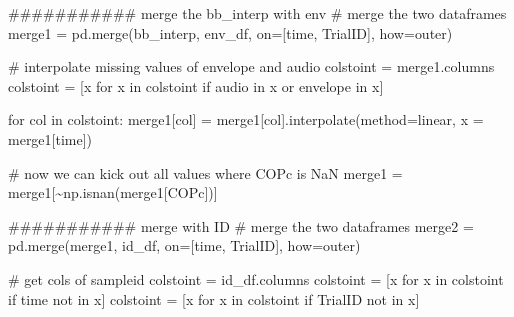 \documentclass[
  letterpaper,
  DIV=11,
  numbers=noendperiod]{scrreprt}
\newenvironment{Shaded}{\begin{snugshade}}{\end{snugshade}}
\newcommand{\CommentTok}[1]{\textcolor[rgb]{0.37,0.37,0.37}{#1}}
\newcommand{\ControlFlowTok}[1]{\textcolor[rgb]{0.00,0.23,0.31}{#1}}
\newcommand{\KeywordTok}[1]{\textcolor[rgb]{0.00,0.23,0.31}{#1}}
\newcommand{\NormalTok}[1]{\textcolor[rgb]{0.00,0.23,0.31}{#1}}
\newcommand{\OperatorTok}[1]{\textcolor[rgb]{0.37,0.37,0.37}{#1}}
\newcommand{\StringTok}[1]{\textcolor[rgb]{0.13,0.47,0.30}{#1}}
\begin{document}
\begin{Shaded}
\begin{Highlighting}[]
    \CommentTok{\#\#\#\#\#\#\#\#\#\#\# merge the bb\_interp with env}
    \CommentTok{\# merge the two dataframes}
\NormalTok{    merge1 }\OperatorTok{=}\NormalTok{ pd.merge(bb\_interp, env\_df, on}\OperatorTok{=}\NormalTok{[}\StringTok{\textquotesingle{}time\textquotesingle{}}\NormalTok{, }\StringTok{\textquotesingle{}TrialID\textquotesingle{}}\NormalTok{], how}\OperatorTok{=}\StringTok{\textquotesingle{}outer\textquotesingle{}}\NormalTok{)}

    \CommentTok{\# interpolate missing values of envelope and audio}
\NormalTok{    colstoint }\OperatorTok{=}\NormalTok{ merge1.columns}
\NormalTok{    colstoint }\OperatorTok{=}\NormalTok{ [x }\ControlFlowTok{for}\NormalTok{ x }\KeywordTok{in}\NormalTok{ colstoint }\ControlFlowTok{if} \StringTok{\textquotesingle{}audio\textquotesingle{}} \KeywordTok{in}\NormalTok{ x }\KeywordTok{or} \StringTok{\textquotesingle{}envelope\textquotesingle{}} \KeywordTok{in}\NormalTok{ x]}

    \ControlFlowTok{for}\NormalTok{ col }\KeywordTok{in}\NormalTok{ colstoint: }
\NormalTok{        merge1[col] }\OperatorTok{=}\NormalTok{ merge1[col].interpolate(method}\OperatorTok{=}\StringTok{\textquotesingle{}linear\textquotesingle{}}\NormalTok{, x }\OperatorTok{=}\NormalTok{ merge1[}\StringTok{\textquotesingle{}time\textquotesingle{}}\NormalTok{])}

    \CommentTok{\# now we can kick out all values where COPc is NaN}
\NormalTok{    merge1 }\OperatorTok{=}\NormalTok{ merge1[}\OperatorTok{\textasciitilde{}}\NormalTok{np.isnan(merge1[}\StringTok{\textquotesingle{}COPc\textquotesingle{}}\NormalTok{])]}

    \CommentTok{\#\#\#\#\#\#\#\#\#\#\# merge with ID}
    \CommentTok{\# merge the two dataframes}
\NormalTok{    merge2 }\OperatorTok{=}\NormalTok{ pd.merge(merge1, id\_df, on}\OperatorTok{=}\NormalTok{[}\StringTok{\textquotesingle{}time\textquotesingle{}}\NormalTok{, }\StringTok{\textquotesingle{}TrialID\textquotesingle{}}\NormalTok{], how}\OperatorTok{=}\StringTok{\textquotesingle{}outer\textquotesingle{}}\NormalTok{)}

    \CommentTok{\# get cols of sampleid}
\NormalTok{    colstoint }\OperatorTok{=}\NormalTok{ id\_df.columns}
\NormalTok{    colstoint }\OperatorTok{=}\NormalTok{ [x }\ControlFlowTok{for}\NormalTok{ x }\KeywordTok{in}\NormalTok{ colstoint }\ControlFlowTok{if} \StringTok{\textquotesingle{}time\textquotesingle{}} \KeywordTok{not} \KeywordTok{in}\NormalTok{ x]}
\NormalTok{    colstoint }\OperatorTok{=}\NormalTok{ [x }\ControlFlowTok{for}\NormalTok{ x }\KeywordTok{in}\NormalTok{ colstoint }\ControlFlowTok{if} \StringTok{\textquotesingle{}TrialID\textquotesingle{}} \KeywordTok{not} \KeywordTok{in}\NormalTok{ x]}


\end{Highlighting}
\end{Shaded}
\end{document}
